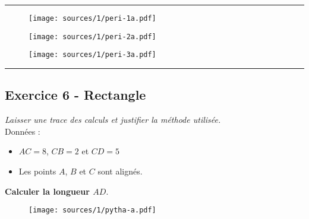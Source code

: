 \documentclass[12pt]{article}
\newcommand{\horrule}[1]{\rule{\linewidth}{#1}} %
\begin{document}
\horrule{0.5px}

\begin{multicols}{3}

  \begin{figure}[H]
    \centering
    \texttt{[image: sources/1/peri-1a.pdf]}
  \end{figure}

  \begin{figure}[H]
    \centering
    \texttt{[image: sources/1/peri-2a.pdf]}
  \end{figure}

  \begin{figure}[H]
    \centering
    \texttt{[image: sources/1/peri-3a.pdf]}
  \end{figure}

\end{multicols}


\horrule{1px}

\begin{multicols}{2}
  \subsection*{Exercice 6 - Rectangle}

  \textit{Laisser une trace des calculs et justifier la méthode utilisée.}\\

  Données : 
  \begin{itemize}
  \item $AC = 8$, $CB = 2$ et $CD = 5$
  \item Les points $A$, $B$ et $C$ sont alignés.\\
  \end{itemize}

  \textbf{Calculer la longueur $AD$}.

  \begin{figure}[H]
    \centering
    \texttt{[image: sources/1/pytha-a.pdf]}
  \end{figure}

\end{multicols}
\end{document}
